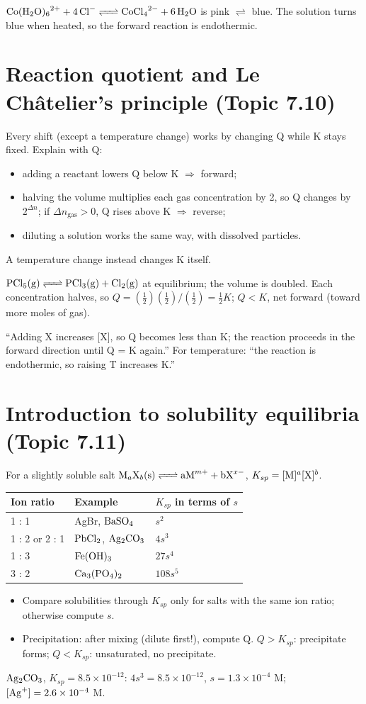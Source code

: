 \documentclass[11pt]{article}
\begin{document}
 $\ce{Co(H2O)6^2+ + 4Cl- <=> CoCl4^2- + 6H2O}$ is pink $\rightleftharpoons$ blue. The solution turns blue when heated, so the forward reaction is endothermic.

\section{Reaction quotient and Le Châtelier's principle (Topic 7.10)}\label{t:7.10}
Every shift (except a temperature change) works by changing Q while K stays fixed. Explain with Q:
\begin{itemize}
\item adding a reactant lowers Q below K $\Rightarrow$ forward;
\item halving the volume multiplies each gas concentration by 2, so Q changes by $2^{\Delta n}$; if $\Delta n_{\text{gas}} > 0$, Q rises above K $\Rightarrow$ reverse;
\item diluting a solution works the same way, with dissolved particles.
\end{itemize}
A temperature change instead changes K itself.

 $\ce{PCl5(g) <=> PCl3(g) + Cl2(g)}$ at equilibrium; the volume is doubled. Each concentration halves, so $Q = (\tfrac12)(\tfrac12)/(\tfrac12) = \tfrac12 K$; $Q < K$, net forward (toward more moles of gas).

\frph ``Adding X increases [X], so Q becomes less than K; the reaction proceeds in the forward direction until Q = K again.'' For temperature: ``the reaction is endothermic, so raising T increases K.''

\section{Introduction to solubility equilibria (Topic 7.11)}\label{t:7.11}
For a slightly soluble salt $\ce{M_aX_b(s) <=> aM^{m+} + bX^{x-}}$, $K_{sp} = [\ce{M}]^a[\ce{X}]^b$.
\begin{center}
\begin{tabular}{lll}\toprule
Ion ratio & Example & $K_{sp}$ in terms of $s$ \\ \midrule
1 : 1 & AgBr, $\ce{BaSO4}$ & $s^2$ \\
1 : 2 or 2 : 1 & $\ce{PbCl2}$, $\ce{Ag2CO3}$ & $4s^3$ \\
1 : 3 & $\ce{Fe(OH)3}$ & $27s^4$ \\
3 : 2 & $\ce{Ca3(PO4)2}$ & $108s^5$ \\ \bottomrule
\end{tabular}
\end{center}
\begin{itemize}
\item Compare solubilities through $K_{sp}$ only for salts with the same ion ratio; otherwise compute $s$.
\item Precipitation: after mixing (dilute first!), compute Q. $Q > K_{sp}$: precipitate forms; $Q < K_{sp}$: unsaturated, no precipitate.
\end{itemize}
 $\ce{Ag2CO3}$, $K_{sp} = 8.5\times10^{-12}$: $4s^3 = 8.5\times10^{-12}$, $s = 1.3\times10^{-4}$ M; $[\ce{Ag+}] = 2.6\times10^{-4}$ M.
\end{document}

